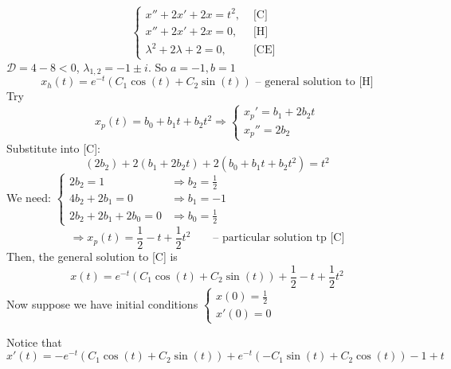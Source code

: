\documentclass[twoside]{article}
\begin{document}
\begin{example}
    \begin{equation}
        \begin{cases}
            x'' + 2x' +2x = t^2, &\text{ [C] }\\
            x'' + 2x' +2x = 0  , &\text{ [H] }\\
            \lambda^2 + 2 \lambda +2 = 0  , &\text{ [CE] }
        \end{cases}
    \end{equation}
    $\mathcal{D} = 4 - 8 < 0 $, $\lambda_{1,2} = -1 \pm i
    $. So $a = -1, b=1$
    \begin{equation}
        x_h(t) = e^{-t} (C_1 \cos(t) + C_2 \sin(t))  \text{ -- general solution to [H]}
    \end{equation}
    Try
    \begin{equation}
        x_p(t) = b_0 + b_1 t + b_2 t^2 \Longrightarrow \begin{cases}
            x_p' = b_1 + 2b_2 t\\
            x_p'' = 2 b_2
        \end{cases}
    \end{equation}
    Substitute into [C]:\begin{equation}
        (2 b_2) + 2 ( b_1 + 2b_2 t ) + 2 (b_0 + b_1 t + b_2 t^2 ) = t^2
    \end{equation}
    We need: $\begin{cases}
        2 b_2 = 1 &\Longrightarrow b_2 = \frac{1}{2}\\
        4 b_2 + 2 b_1 = 0 &\Longrightarrow b_1 = -1 \\
        2 b_2 + 2 b_1 + 2 b_0= 0 &\Longrightarrow b_0 = \frac{1}{2}
    \end{cases}$
    $$\Longrightarrow x_p(t) = \frac{1}{2} - t + \frac{1}{2}t^2 \qquad \text{-- particular solution tp [C]}$$
    Then, the general solution to [C] is \begin{equation}
        x(t) = e^{-t} (C_1 \cos(t) + C_2 \sin(t)) + \frac{1}{2} - t + \frac{1}{2}t^2
    \end{equation}
    Now suppose we have initial conditions $\begin{cases}
        x(0) = \frac{1}{2}\\
        x'(0) = 0
    \end{cases}$

    Notice that $x'(t) = -e^{-t} (C_1 \cos(t) + C_2 \sin(t)) + e^{-t} ( - C_1 \sin(t) + C_2 \cos(t))- 1 + t$


\end{example}
\end{document}
